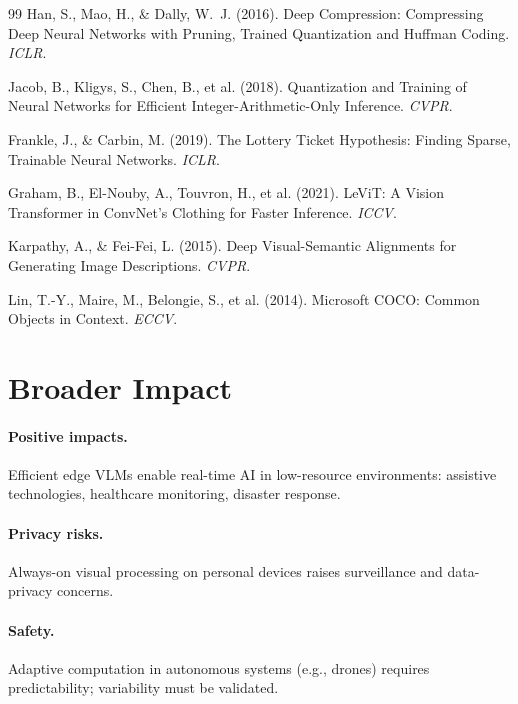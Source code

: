 \documentclass{article}
\begin{document}
{\begin{thebibliography}{99}
Han, S., Mao, H., \& Dally, W.~J. (2016). Deep Compression: Compressing Deep Neural Networks with Pruning, Trained Quantization and Huffman Coding. \emph{ICLR}.

Jacob, B., Kligys, S., Chen, B., et al. (2018). Quantization and Training of Neural Networks for Efficient Integer-Arithmetic-Only Inference. \emph{CVPR}.

Frankle, J., \& Carbin, M. (2019). The Lottery Ticket Hypothesis: Finding Sparse, Trainable Neural Networks. \emph{ICLR}.

Graham, B., El-Nouby, A., Touvron, H., et al. (2021). LeViT: A Vision Transformer in ConvNet's Clothing for Faster Inference. \emph{ICCV}.

Karpathy, A., \& Fei-Fei, L. (2015). Deep Visual-Semantic Alignments for Generating Image Descriptions. \emph{CVPR}.

Lin, T.-Y., Maire, M., Belongie, S., et al. (2014). Microsoft COCO: Common Objects in Context. \emph{ECCV}.

\end{thebibliography}
}



\appendix

\section{Broader Impact}

\paragraph{Positive impacts.}
Efficient edge VLMs enable real-time AI in low-resource environments: assistive technologies, healthcare monitoring, disaster response.

\paragraph{Privacy risks.}
Always-on visual processing on personal devices raises surveillance and data-privacy concerns.

\paragraph{Safety.}
Adaptive computation in autonomous systems (e.g., drones) requires predictability; variability must be validated.
\end{document}

